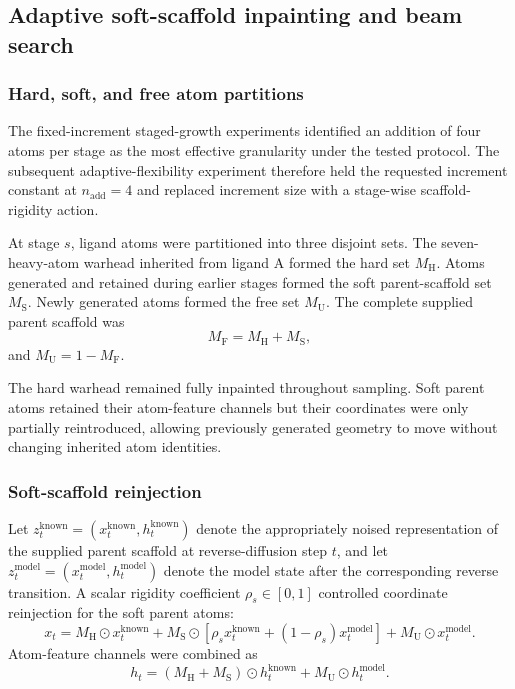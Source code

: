 \subsection{Adaptive soft-scaffold inpainting and beam search}
\label{sec:adaptive-soft-scaffold}

\subsubsection{Hard, soft, and free atom partitions}

The fixed-increment staged-growth experiments identified an addition of
four atoms per stage as the most effective granularity under the tested
protocol. The subsequent adaptive-flexibility experiment therefore held
the requested increment constant at \(n_{\mathrm{add}}=4\) and replaced
increment size with a stage-wise scaffold-rigidity action.

At stage \(s\), ligand atoms were partitioned into three disjoint sets.
The seven-heavy-atom warhead inherited from ligand A formed the hard set
\(M_{\mathrm{H}}\). Atoms generated and retained during earlier stages
formed the soft parent-scaffold set \(M_{\mathrm{S}}\). Newly generated
atoms formed the free set \(M_{\mathrm{U}}\). The complete supplied parent
scaffold was
\[
M_{\mathrm{F}}=M_{\mathrm{H}}+M_{\mathrm{S}},
\]
and \(M_{\mathrm{U}}=1-M_{\mathrm{F}}\).

The hard warhead remained fully inpainted throughout sampling. Soft
parent atoms retained their atom-feature channels but their coordinates
were only partially reintroduced, allowing previously generated geometry
to move without changing inherited atom identities.

\subsubsection{Soft-scaffold reinjection}

Let \(z_t^{\mathrm{known}}=(x_t^{\mathrm{known}},h_t^{\mathrm{known}})\)
denote the appropriately noised representation of the supplied parent
scaffold at reverse-diffusion step \(t\), and let
\(z_t^{\mathrm{model}}=(x_t^{\mathrm{model}},h_t^{\mathrm{model}})\)
denote the model state after the corresponding reverse transition. A
scalar rigidity coefficient \(\rho_s\in[0,1]\) controlled coordinate
reinjection for the soft parent atoms:
\[
x_t =
M_{\mathrm{H}}\odot x_t^{\mathrm{known}}
+
M_{\mathrm{S}}\odot
\left[
\rho_s x_t^{\mathrm{known}}
+
(1-\rho_s)x_t^{\mathrm{model}}
\right]
+
M_{\mathrm{U}}\odot x_t^{\mathrm{model}}.
\]
Atom-feature channels were combined as
\[
h_t =
(M_{\mathrm{H}}+M_{\mathrm{S}})\odot h_t^{\mathrm{known}}
+
M_{\mathrm{U}}\odot h_t^{\mathrm{model}}.
\]

